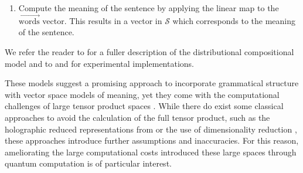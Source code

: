 \begin{enumerate}
\begin{equation}
\begin{aligned}
\begin{tikzpicture}[scale=0.5]
\begin{pgfonlayer}{nodelayer}
                \node [style=none] (28) at (3.75, -0.5) {};
                \node [style=none] (29) at (0.5, -1.75) {};
                \node [style=none] (30) at (-2.75, 2.75) {Mary};
                \node [style=none] (31) at (0.5, 2.75) {likes};
                \node [style=none] (32) at (3.75, 2.75) {words.};
        \end{pgfonlayer}
        \begin{pgfonlayer}{edgelayer}
                \draw [style = thick] (0.center) to (1.center);
                \draw [style = thick] (1.center) to (2.center);
                \draw [style = thick] (2.center) to (0.center);
                \draw [style = thick]  (3.center) to (4.center);
                \draw [style = thick] (8.center) to (6.center);
                \draw [style = thick] (6.center) to (7.center);
                \draw [style = thick] (4.center) to (5.center);
                \draw [style = thick] (3.center) to (5.center);
                \draw [style = thick] (8.center) to (7.center);
                \draw [style = thick] (9.center) to (14.center);
                \draw [style = thick] (10.center) to (15.center);
                \draw [style = thick] (11.center) to (16.center);
                \draw [style = thick] (12.center) to (17.center);
                \draw [style = thick] (13.center) to (18.center);
                \draw [thick, bend right=90, looseness=1.25] (24.center) to (25.center);
                \draw [thick, bend right=90, looseness=1.25] (27.center) to (28.center);
                \draw [style = thick] (26.center) to (29.center);
        \end{pgfonlayer}
\end{tikzpicture}
\end{aligned}
\end{equation}

\item Compute the meaning of the sentence by applying the linear map to the $\overrightarrow{\mbox{words}}$ vector. This results in a vector in $\mathcal{S}$ which corresponds to the meaning of the sentence.
\end{enumerate}

\noindent We refer the reader to \cite{coecke2010mathematical} for a fuller description of the distributional compositional model and to \cite{experimental-catcompdist} and \cite{kartsaklis2012unified} for experimental implementations.

These models suggest a promising approach to incorporate grammatical structure with vector space models of meaning, yet they come with the computational challenges of large tensor product spaces \cite{GrefenstetteThesis2013}. While there do exist some classical approaches to avoid the calculation of the full tensor product, such as the holographic reduced representations from \cite{plate1991holographic} or the use of dimensionality reduction \cite{polajnar2013learning}, these approaches introduce further assumptions and inaccuracies.  For this reason, ameliorating the large computational costs introduced these large spaces through quantum computation is of particular interest.

